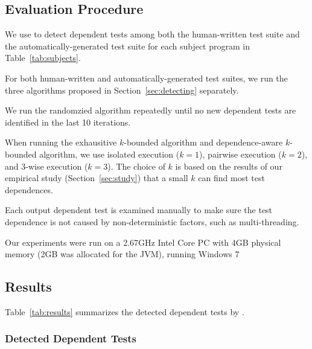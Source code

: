 \subsection{Evaluation Procedure}

We use \ourtool to detect dependent
tests among both the human-written test suite 
and the automatically-generated test suite
for each subject program in Table~\ref{tab:subjects}.


For both human-written and automatically-generated
test suites, we run the three algorithms proposed
in Section~\ref{sec:detecting} separately.

We run the randomzied algorithm repeatedly until no
new dependent tests are identified in the last
10 iterations.

When running the exhausitive $k$-bounded algorithm and dependence-aware
$k$-bounded algorithm,
we use isolated execution ($k = 1$),
pairwise execution ($k = 2$), and
3-wise execution ($k = 3$). The choice of $k$ is
based on the results of our empirical
study (Section~\ref{sec:study}) that a small $k$
can find most test dependences. 



Each output dependent test is examined manually to make
sure the test dependence is not caused by non-deterministic
factors, such as multi-threading.

Our experiments were run on a 2.67GHz Intel Core PC
with 4GB physical memory (2GB was allocated for the JVM),
running Windows 7

\subsection{Results}

Table~\ref{tab:results} summarizes the detected
dependent tests by \ourtool.

\subsubsection{Detected Dependent Tests}
\label{sec:detectedtests}

